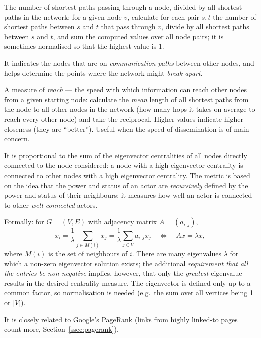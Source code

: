 \documentclass[11pt,a4paper]{article}
\theoremstyle{definition}
\providecommand{\uv}[1]{``#1''}
\begin{document}
\begin{defbox}
The number of shortest paths passing through a node, divided by all shortest paths in the network:
for a given node $v$, calculate for each pair $s,t$ the number of shortest paths between $s$ and $t$
that pass through $v$, divide by all shortest paths between $s$ and $t$, and sum the computed values
over all node pairs; it is sometimes normalised so that the highest value is 1.

It indicates the nodes that are on \emph{communication paths} between other nodes, and helps
determine the points where the network might \emph{break apart}.
\end{defbox}

\begin{defbox}
A measure of \emph{reach} --- the speed with which information can reach other nodes from a given
starting node: calculate the \emph{mean} length of all shortest paths from the node to all other
nodes in the network (how many hops it takes on average to reach every other node) and take the
reciprocal. Higher values indicate higher closeness (they are \uv{better}). Useful when the speed of
dissemination is of main concern.
\end{defbox}

\begin{defbox}
It is proportional to the sum of the eigenvector centralities of all nodes directly connected to the
node considered: a node with a high eigenvector centrality is connected to other nodes with a high
eigenvector centrality. The metric is based on the idea that the power and status of an actor are
\emph{recursively} defined by the power and status of their neighbours; it measures how well an actor
is connected to other \emph{well-connected} actors.

Formally: for $G=(V,E)$ with adjacency matrix $A=(a_{i,j})$,
\[ x_i=\frac1\lambda\sum_{j\in M(i)}x_j=\frac1\lambda\sum_{j\in V}a_{i,j}x_j
   \quad\Longleftrightarrow\quad Ax=\lambda x, \]
where $M(i)$ is the set of neighbours of $i$. There are many eigenvalues $\lambda$ for which a
non-zero eigenvector solution exists; the additional \emph{requirement that all the entries be
non-negative} implies, however, that only the \emph{greatest} eigenvalue results in the desired
centrality measure. The eigenvector is defined only up to a common factor, so normalisation is
needed (e.g.\ the sum over all vertices being 1 or $|V|$).

It is closely related to Google's PageRank (links from highly linked-to pages count more,
Section~\ref{ssec:pagerank}).
\end{defbox}
\end{document}
